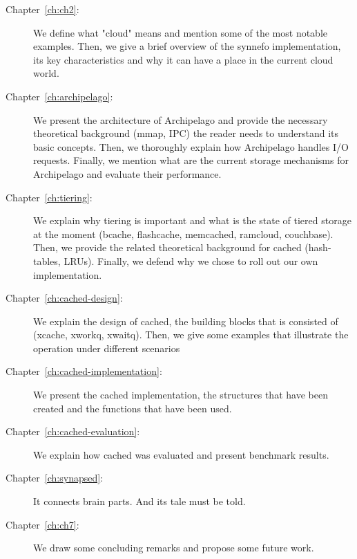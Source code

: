 \begin{description}
\item[Chapter~\ref{ch:ch2}:]
We define what "cloud" means and mention some of the most notable examples.
Then, we give a brief overview of the synnefo implementation, its key
characteristics and why it can have a place in the current cloud world.
\item[Chapter~\ref{ch:archipelago}:]
We present the architecture of Archipelago and provide the necessary 
theoretical background (mmap, IPC) the reader needs to understand its basic 
concepts. Then, we thoroughly explain how Archipelago handles I/O requests.  
Finally, we mention what are the current storage mechanisms for Archipelago and 
evaluate their performance.
\item[Chapter~\ref{ch:tiering}:]
We explain why tiering is important and what is the state of tiered storage at
the moment (bcache, flashcache, memcached, ramcloud, couchbase).  Then, we
provide the related theoretical background for cached (hash-tables, LRUs).
Finally, we defend why we chose to roll out our own implementation.
\item[Chapter~\ref{ch:cached-design}:]
We explain the design of cached, the building blocks that is consisted of
(xcache, xworkq, xwaitq). Then, we give some examples that illustrate the 
operation under different scenarios
\item[Chapter~\ref{ch:cached-implementation}:]
We present the cached implementation, the structures that have been created and 
the functions that have been used.
\item[Chapter~\ref{ch:cached-evaluation}:]
We explain how cached was evaluated and present benchmark results.
\item[Chapter~\ref{ch:synapsed}:]
It connects brain parts. And its tale must be told.
\item[Chapter~\ref{ch:ch7}:]
We draw some concluding remarks and propose some future work.
\end{description}
